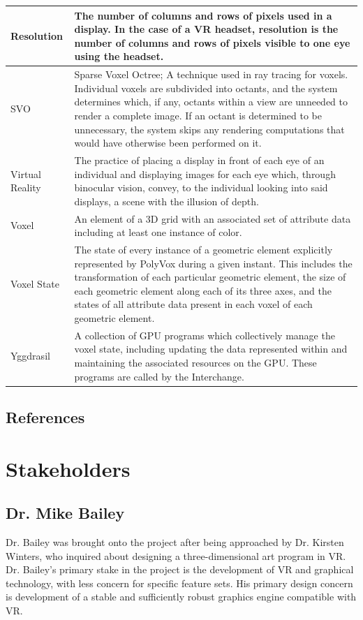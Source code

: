 \documentclass[onecolumn, draftclsnofoot,10pt, compsoc]{IEEEtran}
\begin{document}
\begin{longtable}{ | l | p{12cm} | }
Resolution & The number of columns and rows of pixels used in a display. In the case of  a VR headset, resolution is the number of columns and rows of pixels visible to one eye using the headset. \\ \hline
SVO & Sparse Voxel Octree; A technique used in ray tracing for voxels. Individual voxels are subdivided into octants, and the system determines which, if any, octants within a view are unneeded to render a complete image. If an octant is determined to be unnecessary, the system skips any rendering computations that would have otherwise been performed on it.\\ \hline
Virtual Reality & The practice of placing a display in front of each eye of an individual and displaying images for each eye which, through binocular vision, convey, to the individual looking into said displays, a scene with the illusion of depth.  \\ \hline
Voxel & An element of a 3D grid with an associated set of attribute data including at least one instance of color.  \\ \hline
Voxel State & The state of every instance of a geometric element explicitly represented by PolyVox during a given instant. This includes the transformation of each particular geometric element, the size of each geometric element along each of its three axes, and the states of all attribute data present in each voxel of each geometric element. \\ \hline
Yggdrasil & A collection of GPU programs which collectively manage the voxel state, including updating the data represented within and maintaining the associated resources on the GPU. These programs are called by the Interchange. \\ \hline
\end{longtable}

\subsection{References}

{}

\section{Stakeholders}

\subsection{Dr. Mike Bailey}
Dr. Bailey was brought onto the project after being approached by Dr. Kirsten Winters, who inquired about designing a three-dimensional art program in VR. Dr. Bailey's primary stake in the project is the development of VR and graphical technology, with less concern for specific feature sets. His primary design concern is development of a stable and sufficiently robust graphics engine compatible with VR.
\end{document}
